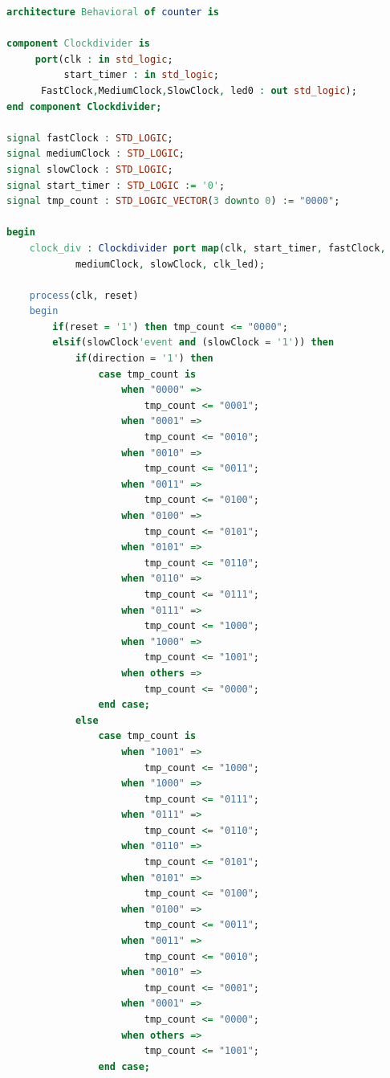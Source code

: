 \documentclass[11pt]{article}
\begin{document}
\begin{appendices}
\begin{lstlisting}[language=VHDL]
architecture Behavioral of counter is

component Clockdivider is
     port(clk : in std_logic;
          start_timer : in std_logic;
	  FastClock,MediumClock,SlowClock, led0 : out std_logic);
end component Clockdivider;

signal fastClock : STD_LOGIC;
signal mediumClock : STD_LOGIC;
signal slowClock : STD_LOGIC;
signal start_timer : STD_LOGIC := '0';
signal tmp_count : STD_LOGIC_VECTOR(3 downto 0) := "0000";

begin
    clock_div : Clockdivider port map(clk, start_timer, fastClock, 
    		mediumClock, slowClock, clk_led);

    process(clk, reset)
    begin
        if(reset = '1') then tmp_count <= "0000";
        elsif(slowClock'event and (slowClock = '1')) then
            if(direction = '1') then
                case tmp_count is
                    when "0000" =>
                        tmp_count <= "0001";
                    when "0001" =>
                        tmp_count <= "0010";
                    when "0010" =>
                        tmp_count <= "0011";
                    when "0011" =>
                        tmp_count <= "0100";
                    when "0100" =>
                        tmp_count <= "0101";
                    when "0101" =>
                        tmp_count <= "0110";
                    when "0110" =>
                        tmp_count <= "0111";
                    when "0111" =>
                        tmp_count <= "1000";
                    when "1000" =>
                        tmp_count <= "1001";
                    when others =>
                        tmp_count <= "0000";
                end case;
            else
                case tmp_count is
                    when "1001" =>
                        tmp_count <= "1000";
                    when "1000" =>
                        tmp_count <= "0111";
                    when "0111" =>
                        tmp_count <= "0110";
                    when "0110" =>
                        tmp_count <= "0101";
                    when "0101" =>
                        tmp_count <= "0100";
                    when "0100" =>
                        tmp_count <= "0011";
                    when "0011" =>
                        tmp_count <= "0010";
                    when "0010" =>
                        tmp_count <= "0001";
                    when "0001" =>
                        tmp_count <= "0000";
                    when others =>
                        tmp_count <= "1001";
                end case;

\end{lstlisting}
\end{appendices}
\end{document}
